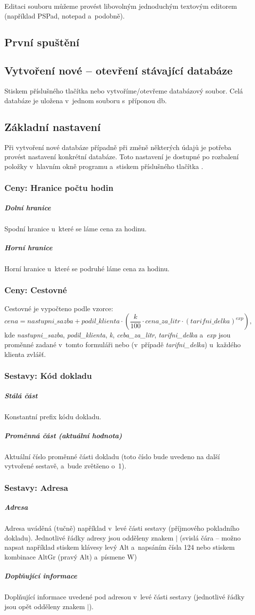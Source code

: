 \documentclass[12pt]{article}
\newcommand{\tl}[1]{\frame{#1}}
\begin{document}
Editaci souboru můžeme provést libovolným jednoduchým textovým editorem (například PSPad, notepad
a~podobně).


\subsection{První spuštění}
\subsection{Vytvoření nové -- otevření stávající databáze}
Stiskem příslušného tlačítka \tl{Nový} nebo \tl{Otevřít} vytvoříme/otevřeme databázový soubor. Celá
databáze je uložena v~jednom souboru s~příponou db.
\subsection{Základní nastavení}
Při vytvoření nové databáze případně při změně některých údajů je potřeba provést nastavení
konkrétní databáze. Toto nastavení je dostupné po rozbalení položky \tl{Pokročilé} v~hlavním okně
programu a~stiskem příslušného tlačítka \tl{Nastavení}.
\subsubsection{Ceny: Hranice počtu hodin}
\subparagraph{Dolní hranice} Spodní hranice u~které se láme cena za hodinu.
\subparagraph{Horní hranice} Horní hranice u~které se podruhé láme cena za hodinu.
\subsubsection{Ceny: Cestovné}
Cestovné je vypočteno podle vzorce:
\[cena = nastupni\_sazba + podil\_klienta \cdot \left(\frac{k}{100} \cdot cena\_za\_litr \cdot
(tarifni\_delka)^{exp}\right),\]
kde \emph{nastupni\_sazba}, \emph{podil\_klienta}, \emph{k}, \emph{ceba\_za\_litr},
\emph{tarifni\_delka} a~\emph{exp} jsou proměnné zadané v~tomto formuláři nebo (v~případě
\emph{tarifni\_delka}) u~každého klienta zvlášť.
\subsubsection{Sestavy: Kód dokladu}
\subparagraph{Stálá část} Konstantní prefix kódu dokladu.
\subparagraph{Proměnná část (aktuální hodnota)} Aktuální číslo proměnné části dokladu (toto číslo
bude uvedeno na další vytvořené sestavě, a~bude zvětšeno o~1).
\subsubsection{Sestavy: Adresa}
\subparagraph{Adresa} Adresa uváděná (tučně) například v~levé části sestavy (příjmového pokladního
dokladu). Jednotlivé řádky adresy jsou odděleny znakem $|$ (svislá čára -- možno napsat například
stiskem klávesy levý Alt a~napsáním čísla 124 nebo stiskem kombinace AltGr (pravý Alt) a~písmene W)
\subparagraph{Doplňující informace} Doplňující informace uvedené pod adresou
v~levé části sestavy (jednotlivé řádky jsou opět odděleny znakem $|$). 
\end{document}
